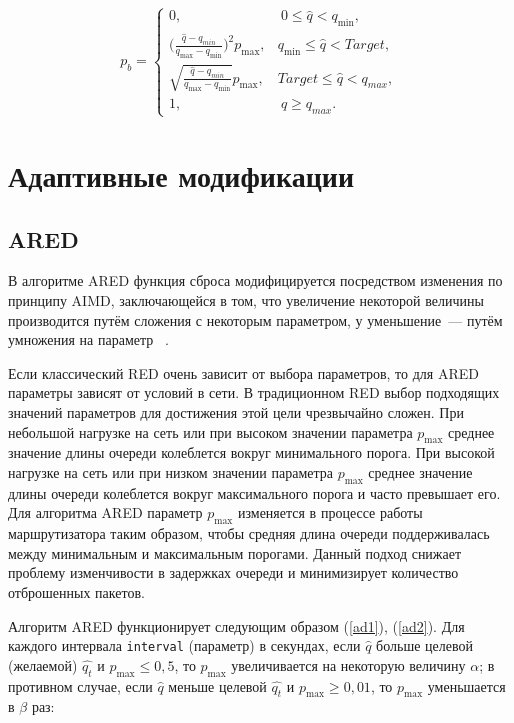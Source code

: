 \begin{equation}
\label{SmRED}
p_{b} = \begin{cases}
        0, &  \ 0 \leqslant \hat{q} < q_{\min},
        \\
        ({\frac{\hat{q} - q_{min}}{q_{\max} - q_{\min}})^2} {p_{\max}}, &  q_{\min} \leqslant  \hat{q} < {Target},
        \\
        \sqrt{{\frac{\hat{q} - q_{min}}{q_{\max} - q_{\min}}}} {p_{\max}}, & {Target} \leqslant  \hat{q} < q_{max},
        \\
        1, &  \ \hat{q} \geqslant q_{max}.
\end{cases}
\end{equation}


\section{Адаптивные модификации}
\label{chap2:sec3}

\subsection{ARED}

В алгоритме ARED функция сброса модифицируется
посредством изменения по принципу AIMD, заключающейся в том, что
увеличение некоторой величины производится путём сложения с некоторым
параметром, у уменьшение~--- путём умножения на
параметр ~\cite{ARED1, ARED2}. 

Если классический RED очень зависит от выбора параметров, то для ARED параметры зависят от условий в сети. 
В традиционном RED выбор подходящих значений параметров для достижения этой цели чрезвычайно сложен. 
При небольшой нагрузке на сеть или при высоком значении параметра $p_{\max}$  среднее значение длины очереди колеблется вокруг минимального порога. 
При высокой нагрузке на сеть или при низком значении параметра $p_{\max}$  среднее значение длины очереди колеблется вокруг максимального порога 
и часто превышает его. Для алгоритма ARED параметр $p_{\max}$ изменяется в процессе работы маршрутизатора таким образом, чтобы 
средняя длина очереди поддерживалась между минимальным и максимальным порогами. 
Данный подход снижает проблему изменчивости в задержках очереди и 
минимизирует количество отброшенных пакетов. 

Алгоритм ARED функционирует следующим образом (\eqref{ad1}),
(\eqref{ad2}). Для каждого интервала \verb|interval| (параметр) в
секундах, если $\hat{q}$ больше целевой (желаемой) $\hat{q_t}$ и
$p_{\max} \leqslant 0,5$, то $p_{\max}$ увеличивается на некоторую
величину $\alpha$; в противном случае, если $\hat{q}$ меньше целевой
$\hat{q_t}$ и $p_{\max}\geqslant 0,01$, то $p_{\max}$ уменьшается в
$\beta$ раз:

